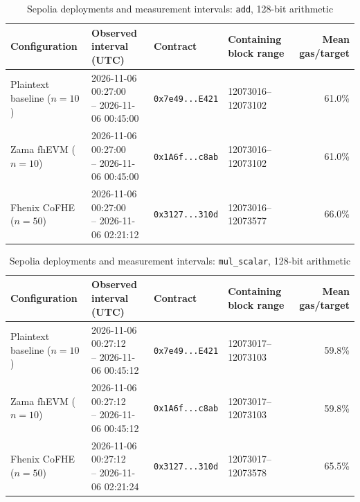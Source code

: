 \begin{table}[!t]
\caption{Sepolia deployments and measurement intervals: \texttt{add}, 128-bit arithmetic}
\label{tab:sepolia-experiment-deployments-classic-euint128-add}
\centering
\footnotesize
\setlength{\tabcolsep}{4pt}
\begin{tabular}{|l|l|l|l|r|}
\hline
\textbf{Configuration} &
\textbf{Observed interval (UTC)} &
\textbf{Contract} &
\textbf{Containing block range} &
\textbf{Mean gas/target} \\
\hline
Plaintext baseline (\(n=10\)) &
\shortstack[l]{2026-11-06 00:27:00 \\ -- 2026-11-06 00:45:00} &
\texttt{0x7e49...E421} &
12073016--12073102 &
61.0\% \\
\hline
Zama fhEVM (\(n=10\)) &
\shortstack[l]{2026-11-06 00:27:00 \\ -- 2026-11-06 00:45:00} &
\texttt{0x1A6f...c8ab} &
12073016--12073102 &
61.0\% \\
\hline
Fhenix CoFHE (\(n=50\)) &
\shortstack[l]{2026-11-06 00:27:00 \\ -- 2026-11-06 02:21:12} &
\texttt{0x3127...310d} &
12073016--12073577 &
66.0\% \\
\hline
\end{tabular}
\end{table}

\begin{table}[!t]
\caption{Sepolia deployments and measurement intervals: \texttt{mul\_scalar}, 128-bit arithmetic}
\label{tab:sepolia-experiment-deployments-classic-euint128-mul-scalar}
\centering
\footnotesize
\setlength{\tabcolsep}{4pt}
\begin{tabular}{|l|l|l|l|r|}
\hline
\textbf{Configuration} &
\textbf{Observed interval (UTC)} &
\textbf{Contract} &
\textbf{Containing block range} &
\textbf{Mean gas/target} \\
\hline
Plaintext baseline (\(n=10\)) &
\shortstack[l]{2026-11-06 00:27:12 \\ -- 2026-11-06 00:45:12} &
\texttt{0x7e49...E421} &
12073017--12073103 &
59.8\% \\
\hline
Zama fhEVM (\(n=10\)) &
\shortstack[l]{2026-11-06 00:27:12 \\ -- 2026-11-06 00:45:12} &
\texttt{0x1A6f...c8ab} &
12073017--12073103 &
59.8\% \\
\hline
Fhenix CoFHE (\(n=50\)) &
\shortstack[l]{2026-11-06 00:27:12 \\ -- 2026-11-06 02:21:24} &
\texttt{0x3127...310d} &
12073017--12073578 &
65.5\% \\
\hline
\end{tabular}
\end{table}

